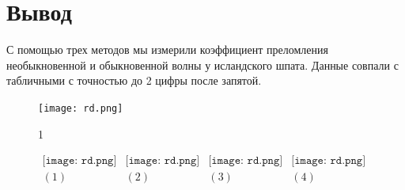 \section*{Вывод}
С помощью трех методов мы измерили коэффициент преломления необыкновенной и обыкновенной волны у исландского шпата. Данные совпали с табличными с точностью до 2 цифры после запятой.









\lipsum[1-4]
\begin{figure}
\centering
\texttt{[image: rd.png]}
\caption{1}
\end{figure}
\lipsum[1-6]


\begin{figure}[h]
\begin{center}$
\begin{array}{cccc}
\texttt{[image: rd.png]}&
\texttt{[image: rd.png]}&
\texttt{[image: rd.png]}&
\texttt{[image: rd.png]}\\
(1) & (2) & (3) & (4)
\end{array}$
\end{center}
\end{figure}
